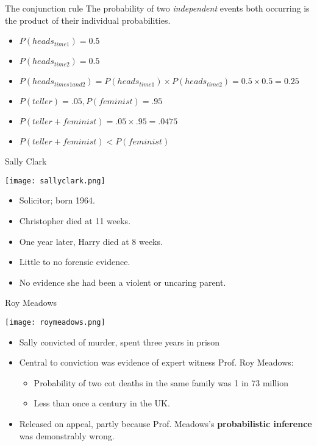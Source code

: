 \documentclass{beamer}
\begin{document}
\begin{frame}{The conjunction rule}
The probability of two \emph{independent} events both occurring is the product of their individual probabilities.
\begin{itemize}
\item $P(heads_{time 1}) = 0.5$
\item $P(heads_{time 2}) = 0.5$
\item $P(heads_{times 1 and 2}) = P(heads_{time 1}) \times P(heads_{time 2}) = 0.5 \times 0.5 = 0.25$
\item $P(teller) = .05, P(feminist) = .95$
\item $P(teller + feminist) = .05 \times .95 = .0475$
\item $P(teller + feminist) < P(feminist)$
\end{itemize}
\end{frame}

\begin{frame}{Sally Clark}
\centerline{\texttt{[image: sallyclark.png]}}
\begin{itemize}
\item Solicitor; born 1964.
\item Christopher died at 11 weeks.
\item One year later, Harry died at 8 weeks.
\item Little to no forensic evidence.
\item No evidence she had been a violent or uncaring parent.
\end{itemize}
\end{frame}

\begin{frame}{Roy Meadows}
\centerline{\texttt{[image: roymeadows.png]}}
\begin{itemize}
\item Sally convicted of murder, spent three years in prison
\item Central to conviction was evidence of expert witness Prof. Roy Meadows:
\begin{itemize}
\item Probability of two cot deaths in the same family was 1 in 73 million
\item Less than once a century in the UK.
\end{itemize}
\item Released on appeal, partly because Prof. Meadows's \textbf{probabilistic inference} was demonstrably wrong.
\end{itemize}
\end{frame}
\end{document}
